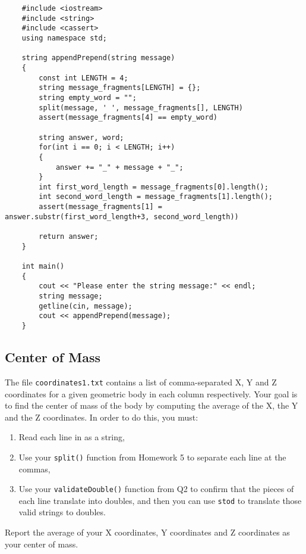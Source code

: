 \begin{verbatim}
    #include <iostream>
    #include <string>
    #include <cassert>
    using namespace std;
    
    string appendPrepend(string message)
    {
        const int LENGTH = 4;
        string message_fragments[LENGTH] = {};
        string empty_word = "";
        split(message, ' ', message_fragments[], LENGTH) 
        assert(message_fragments[4] == empty_word) 
    
        string answer, word; 
        for(int i == 0; i < LENGTH; i++)
        {
            answer += "_" + message + "_";
        }
        int first_word_length = message_fragments[0].length();
        int second_word_length = message_fragments[1].length();
        assert(message_fragments[1] = answer.substr(first_word_length+3, second_word_length))
    
        return answer;
    }
    
    int main()
    {
        cout << "Please enter the string message:" << endl;
        string message;
        getline(cin, message);
        cout << appendPrepend(message);
    }
\end{verbatim}

\newpage 

\subsection{Center of Mass}

The file \texttt{coordinates1.txt} contains a list of comma-separated X, Y and Z coordinates for a given geometric body in each column respectively. Your goal is to find the center of mass of the body by computing the average of the X, the Y and the Z coordinates. In order to do this, you must:

\begin{enumerate}
    \item Read each line in as a string,
    \item Use your \texttt{split()} function from Homework 5 to separate each line at the commas,
    \item Use your \texttt{validateDouble()} function from Q2 to confirm that the pieces of each line translate into doubles, and then you can use \texttt{stod} to translate those valid strings to doubles.
\end{enumerate}

Report the average of your X coordinates, Y coordinates and Z coordinates as your center of mass.

